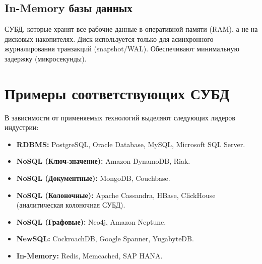 \documentclass[12pt, a4paper]{article}
\begin{document}
\subsection{In-Memory базы данных}
СУБД, которые хранят все рабочие данные в оперативной памяти (RAM), а не на дисковых накопителях. Диск используется только для асинхронного журналирования транзакций (snapshot/WAL). Обеспечивают минимальную задержку (микросекунды).

\section{Примеры соответствующих СУБД}

В зависимости от применяемых технологий выделяют следующих лидеров индустрии:

\begin{itemize}
    \item \textbf{RDBMS:} PostgreSQL, Oracle Database, MySQL, Microsoft SQL Server.
    \item \textbf{NoSQL (Ключ-значение):} Amazon DynamoDB, Riak.
    \item \textbf{NoSQL (Документные):} MongoDB, Couchbase.
    \item \textbf{NoSQL (Колоночные):} Apache Cassandra, HBase, ClickHouse (аналитическая колоночная СУБД).
    \item \textbf{NoSQL (Графовые):} Neo4j, Amazon Neptune.
    \item \textbf{NewSQL:} CockroachDB, Google Spanner, YugabyteDB.
    \item \textbf{In-Memory:} Redis, Memcached, SAP HANA.
\end{itemize}
\end{document}
